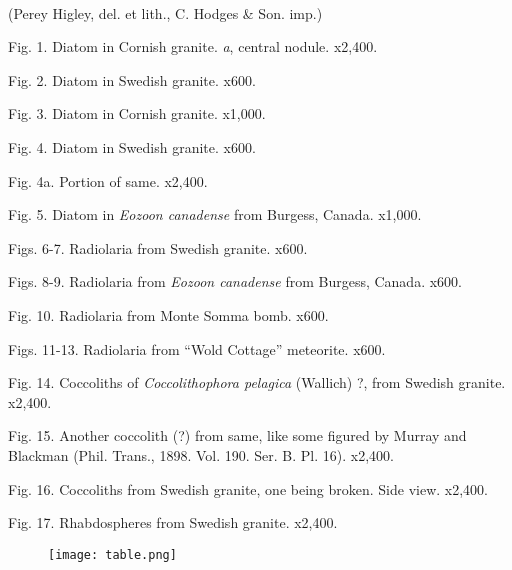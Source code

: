 \documentclass[a4paper, 12pt, oneside]{article}
\begin{document}
\paragraph{}
(Perey Higley, del. et lith., C. Hodges \& Son. imp.)

Fig. 1. Diatom in Cornish granite. \emph{a}, central nodule. x2,400.

Fig. 2. Diatom in Swedish granite. x600.

Fig. 3. Diatom in Cornish granite. x1,000.

Fig. 4. Diatom in Swedish granite. x600.

Fig. 4a. Portion of same. x2,400.

Fig. 5. Diatom in \emph{Eozoon canadense} from Burgess, Canada. x1,000.

Figs. 6-7. Radiolaria from Swedish granite. x600.

Figs. 8-9. Radiolaria from \emph{Eozoon canadense} from Burgess, Canada. x600.

Fig. 10. Radiolaria from Monte Somma bomb. x600.

Figs. 11-13. Radiolaria from ``Wold Cottage'' meteorite. x600.

Fig. 14. Coccoliths of \emph{Coccolithophora pelagica} (Wallich) ?, from Swedish granite. x2,400.

Fig. 15. Another coccolith (?) from same, like some figured by Murray and Blackman (Phil. Trans., 1898. Vol. 190. Ser. B. Pl. 16). x2,400.

Fig. 16. Coccoliths from Swedish granite, one being broken. Side view. x2,400.

Fig. 17. Rhabdospheres from Swedish granite. x2,400.
\clearpage
\begin{figure}[b]
\centering
\texttt{[image: table.png]}
\end{figure}
\clearpage
\end{document}
